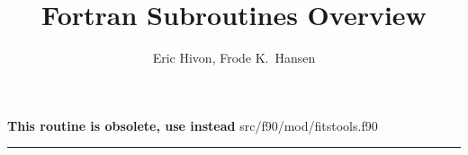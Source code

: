 
\sloppy


\title{\healpix Fortran Subroutines Overview}
 \section[read\_asctab*]{ }
\label{sub:read_asctab}
\author{Eric Hivon, Frode K.~Hansen}

\begin{facility}
{ {\bf This routine is obsolete, use  instead} }
{src/f90/mod/fitstools.f90}
\end{facility}

\rule{\hsize}{2mm}

\newpage

